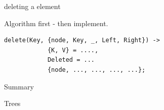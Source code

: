 \begin{frame}[fragile]{deleting a element}

\pause Algorithm first - then implement.

\pause
\begin{verbatim}
delete(Key, {node, Key, _, Left, Right}) -> 
            {K, V} = ....,
            Deleted = ...
            {node, ..., ..., ..., ...};
\end{verbatim}

\end{frame}



\begin{frame}{Summary}

\vspace{40pt}\hspace{80pt}Trees

\end{frame}





